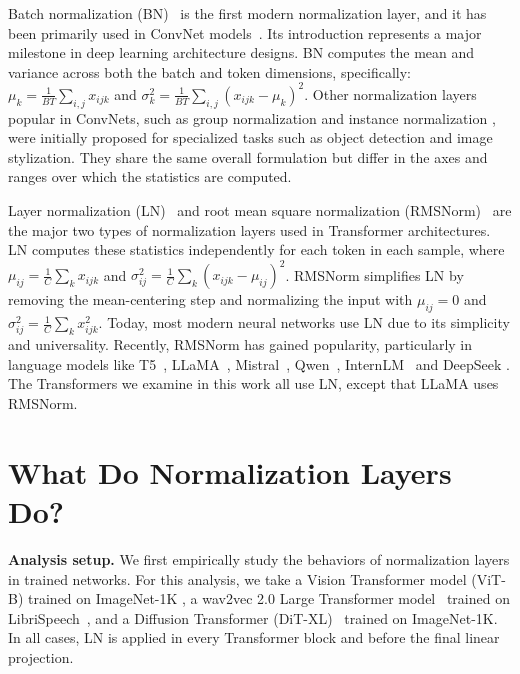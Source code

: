 \documentclass[]{fairmeta}
\renewcommand{\paragraph}[1]{\vspace{1.25mm}\noindent\textbf{#1}}
\begin{document}
Batch normalization (BN)~\citep{ioffe2015batch} is the first modern normalization layer, and it has been primarily used in ConvNet models~\citep{szegedy2016rethinking,he2016deep,xie2017aggregated}. Its introduction represents a major milestone in deep learning architecture designs. BN computes the mean and variance across both the batch and token dimensions, specifically: $\mu_k = \frac{1}{B T} \sum_{i,j} x_{i j k}$ and $\sigma^2_k = \frac{1}{B T} \sum_{i, j} \left( x_{i j k} - \mu_k \right)^2 $. Other normalization layers popular in ConvNets, such as group normalization \citep{wu2018group} and instance normalization \citep{ulyanov2016instance}, were initially proposed for specialized tasks such as object detection and image stylization. They share the same overall formulation but differ in the axes and ranges over which the statistics are computed.

Layer normalization (LN)~\citep{ba2016layer} and 
root mean square normalization (RMSNorm)~\citep{zhang2019root} are the major two types of normalization layers used in Transformer architectures.
LN computes these statistics independently for each token in each sample, where $\mu_{i j} = \frac{1}{C} \sum_{k} x_{i j k}$ and $\sigma^2_{i j} = \frac{1}{C} \sum_{k} \left( x_{i j k} - \mu_{ij} \right)^2 $.
RMSNorm \citep{zhang2019root} simplifies LN by removing the mean-centering step and normalizing the input with $\mu_{ij} = 0$ and $\sigma^2_{i j} = \frac{1}{C} \sum_{k} x^2_{i j k}$. 
Today, most modern neural networks use LN due to its simplicity and universality. Recently, RMSNorm has gained popularity, particularly in language models like T5~\citep{raffel2020exploring}, LLaMA~\citep{touvron2023llama,touvron2023llama2, dubey2024llama}, Mistral~\citep{jiang2023mistral}, Qwen~\citep{bai2023qwen, yang2024qwen2}, InternLM~\citep{zhang2024internlm, cai2024internlm2} and DeepSeek \citep{liu2024deepseek, guo2025deepseek}. The Transformers we examine in this work all use LN, except that LLaMA uses RMSNorm.

\section{What Do Normalization Layers Do?}

\paragraph{Analysis setup.}
We first empirically study the behaviors of normalization layers in trained networks. For this analysis, we take a Vision Transformer model (ViT-B) \citep{dosovitskiy2020image} trained on ImageNet-1K \citep{deng2009imagenet}, a wav2vec 2.0 Large Transformer model~\citep{baevski2020wav2vec} trained on LibriSpeech~\citep{panayotov2015librispeech}, and a Diffusion Transformer (DiT-XL)~\citep{peebles2023scalable} trained on ImageNet-1K. In all cases, LN is applied in every Transformer block and before the final linear projection.
\end{document}

